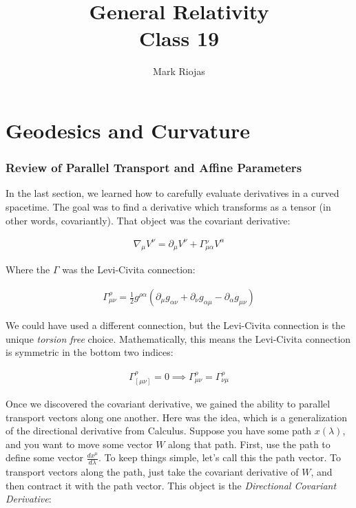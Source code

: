 \documentclass[10pt]{article}
\title{{\Huge General Relativity}\\{\Large{Class 19}}} %
\author{Mark Riojas}
\begin{document}
    \maketitle
    \flushbottom
    \newpage
    \pagestyle{fancynotes}
    \part{Geodesics and Curvature}

    \section{Review of Parallel Transport and Affine Parameters}
	In the last section, we learned how to carefully evaluate derivatives in a curved spacetime. The goal was to find a derivative which transforms as a tensor (in other words, covariantly). That object was the covariant derivative:

\begin{align}\label{eq:EFE}
    \nabla_\mu V^\nu = \partial_\mu V^\nu + {\Gamma}{^\nu _{\mu \alpha}}V^\alpha
\end{align}

Where the $\Gamma$ was the Levi-Civita connection:

\begin{align}\label{eq:EFE}
    \Gamma^\rho_{\mu \nu} = \frac{1}{2} g^{\rho \alpha}\left( \partial_\mu g_{\alpha \nu} + \partial_\nu g_{\alpha \mu} - \partial_\alpha g_{\mu \nu}\right)
\end{align}

We could have used a different connection, but the Levi-Civita connection is the unique \textit{torsion free} choice. Mathematically, this means the Levi-Civita connection is symmetric in the bottom two indices:


\begin{align}\label{eq:EFE}
    \Gamma^{\rho}_{[\mu \nu]} = 0 \implies \Gamma^{\rho}_{\mu \nu} = \Gamma^\rho_{\nu \mu}
\end{align}

Once we discovered the covariant derivative, we gained the ability to parallel transport vectors along one another. Here was the idea, which is a generalization of the directional derivative from Calculus. Suppose you have some path $x(\lambda)$, and you want to move some vector $W$ along that path. First, use the path to define some vector $\frac{dx^\mu}{d\lambda}$. To keep things simple, let's call this the path vector. To transport vectors along the path, just take the covariant derivative of $W$, and then contract it with the path vector. This object is the \textit{Directional Covariant Derivative}:
\end{document}
